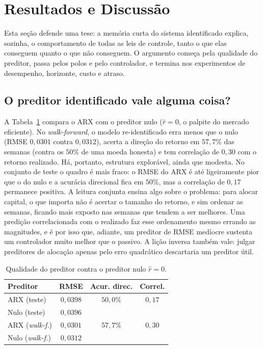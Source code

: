 \documentclass[conference]{IEEEtran}
\begin{document}
\section{Resultados e Discussão}\label{sec:resultados}

Esta seção defende uma tese: a memória curta do sistema identificado explica, sozinha, o comportamento de todas as leis de controle, tanto o que elas conseguem quanto o que não conseguem. O argumento começa pela qualidade do preditor, passa pelos polos e pelo controlador, e termina nos experimentos de desempenho, horizonte, custo e atraso.

\subsection{O preditor identificado vale alguma coisa?}

A Tabela~\ref{tab:previsor} compara o ARX com o preditor nulo ($\hat{r}=0$, o palpite do mercado eficiente). No \emph{walk-forward}, o modelo re-identificado erra menos que o nulo (RMSE $0{,}0301$ contra $0{,}0312$), acerta a direção do retorno em $57{,}7\%$ das semanas (contra os $50\%$ de uma moeda honesta) e tem correlação de $0{,}30$ com o retorno realizado. Há, portanto, estrutura explorável, ainda que modesta. No conjunto de teste o quadro é mais fraco: o RMSE do ARX é até ligeiramente pior que o do nulo e a acurácia direcional fica em $50\%$, mas a correlação de $0{,}17$ permanece positiva. A leitura conjunta ensina algo sobre o problema: para alocar capital, o que importa não é acertar o tamanho do retorno, e sim ordenar as semanas, ficando mais exposto nas semanas que tendem a ser melhores. Uma predição correlacionada com o realizado faz esse ordenamento mesmo errando as magnitudes, e é por isso que, adiante, um preditor de RMSE medíocre sustenta um controlador muito melhor que o passivo. A lição inversa também vale: julgar preditores de alocação apenas pelo erro quadrático descartaria um preditor útil.

\begin{table}[!t]
\centering
\caption{Qualidade do preditor contra o preditor nulo $\hat{r}=0$.}
\label{tab:previsor}
\begin{tabular}{lccc}
\toprule
Preditor & RMSE & Acur. direc. & Correl. \\
\midrule
ARX (teste)            & $0{,}0398$ & $50{,}0\%$ & $0{,}17$ \\
Nulo (teste)           & $0{,}0396$ &            &          \\
ARX (\emph{walk-f.})   & $0{,}0301$ & $57{,}7\%$ & $0{,}30$ \\
Nulo (\emph{walk-f.})  & $0{,}0312$ &            &          \\
\bottomrule
\end{tabular}
\end{table}
\end{document}
